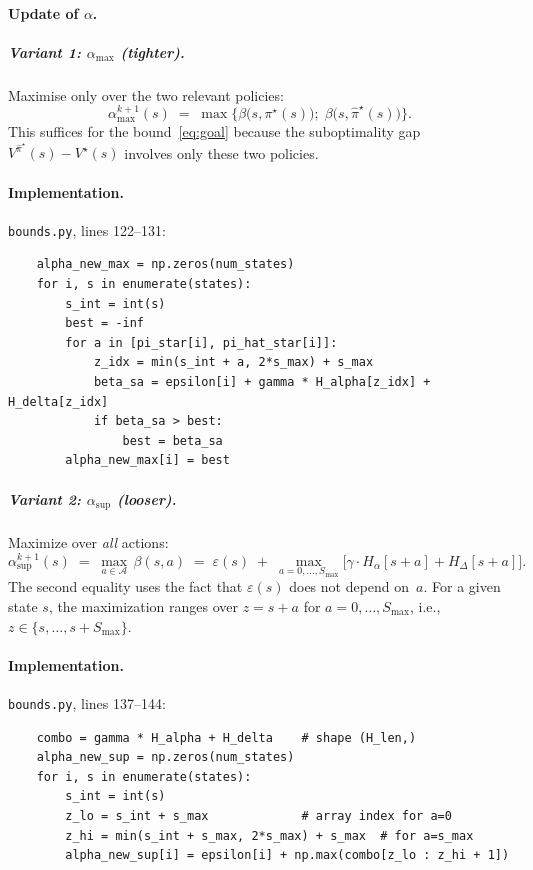 \documentclass[11pt]{article}
\newcommand{\Smax}{S_{\max}}
\newcommand{\pistar}{\pi^\star}
\newcommand{\pihatstar}{\hat\pi^\star}
\newcommand{\Vstar}{V^\star}
\newcommand{\Vpihat}{V^{\pihatstar}}
\begin{document}
\paragraph{Update of $\alpha$.}

\subparagraph{Variant 1: $\alpha_{\max}$ (tighter).}
Maximise only over the two relevant policies:
\begin{equation}\label{eq:alpha-max}
  \alpha^{k+1}_{\max}(s)
  \;=\; \max\!\Big\{
    \beta\bigl(s , \pistar(s)\bigr) ;\;
    \beta\bigl(s , \pihatstar(s)\bigr)
  \Big\}.
\end{equation}
This suffices for the bound~\eqref{eq:goal} because the suboptimality gap
$\Vpihat(s) - \Vstar(s)$ involves only these two policies.

\paragraph{Implementation.}
\texttt{bounds.py}, lines 122--131:
\begin{verbatim}
    alpha_new_max = np.zeros(num_states)
    for i, s in enumerate(states):
        s_int = int(s)
        best = -inf
        for a in [pi_star[i], pi_hat_star[i]]:
            z_idx = min(s_int + a, 2*s_max) + s_max
            beta_sa = epsilon[i] + gamma * H_alpha[z_idx] + H_delta[z_idx]
            if beta_sa > best:
                best = beta_sa
        alpha_new_max[i] = best
\end{verbatim}

\subparagraph{Variant 2: $\alpha_{\sup}$ (looser).}
Maximize over \emph{all} actions:
\begin{equation}\label{eq:alpha-sup}
  \alpha^{k+1}_{\sup}(s)
  \;=\; \max_{a \in \mathcal{A}}\, \beta(s, a)
  \;=\; \varepsilon(s)
  \;+\; \max_{a = 0, \ldots, \Smax}
        \bigl[\gamma \cdot H_\alpha[s+a] + H_\Delta[s+a]\bigr].
\end{equation}
The second equality uses the fact that $\varepsilon(s)$ does not depend on~$a$.
For a given state $s$, the maximization ranges over $z = s + a$ for
$a = 0, \ldots, \Smax$, i.e., $z \in \{s, \ldots, s + \Smax\}$.

\paragraph{Implementation.}
\texttt{bounds.py}, lines 137--144:
\begin{verbatim}
    combo = gamma * H_alpha + H_delta    # shape (H_len,)
    alpha_new_sup = np.zeros(num_states)
    for i, s in enumerate(states):
        s_int = int(s)
        z_lo = s_int + s_max             # array index for a=0
        z_hi = min(s_int + s_max, 2*s_max) + s_max  # for a=s_max
        alpha_new_sup[i] = epsilon[i] + np.max(combo[z_lo : z_hi + 1])
\end{verbatim}
\end{document}
